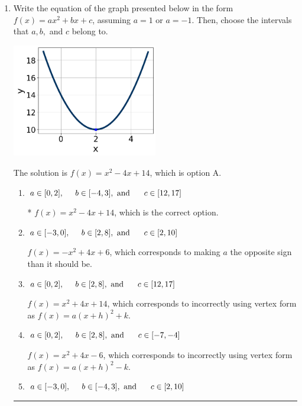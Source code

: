 \documentclass{extbook}[14pt]
\newcommand{\litem}[1]{\item #1

\rule{\textwidth}{0.4pt}}
\begin{document}
\begin{enumerate}\litem{
Write the equation of the graph presented below in the form $f(x)=ax^2+bx+c$, assuming  $a=1$ or $a=-1$. Then, choose the intervals that $a, b,$ and $c$ belong to.

\begin{center}
    \includegraphics[width=0.5\textwidth]{../Figures/quadraticGraphToEquationA.png}
\end{center}




The solution is \( f(x) = x^{2} -4 x + 14 \), which is option A.\begin{enumerate}[label=\Alph*.]
\item \( a \in [0, 2], \hspace*{5mm} b \in [-4, 3], \text{ and } \hspace*{5mm} c \in [12, 17] \)

* $f(x)=x^{2} -4 x + 14$, which is the correct option.
\item \( a \in [-3, 0], \hspace*{5mm} b \in [2, 8], \text{ and } \hspace*{5mm} c \in [2, 10] \)

$f(x)=-x^{2} +4 x + 6$, which corresponds to making $a$ the opposite sign than it should be.
\item \( a \in [0, 2], \hspace*{5mm} b \in [2, 8], \text{ and } \hspace*{5mm} c \in [12, 17] \)

$f(x)=x^{2} +4 x + 14$, which corresponds to incorrectly using vertex form as $f(x) = a(x+h)^2+k$.
\item \( a \in [0, 2], \hspace*{5mm} b \in [2, 8], \text{ and } \hspace*{5mm} c \in [-7, -4] \)

$f(x)=x^{2} +4 x -6$, which corresponds to incorrectly using vertex form as $f(x) = a(x+h)^2 - k$.
\item \( a \in [-3, 0], \hspace*{5mm} b \in [-4, 3], \text{ and } \hspace*{5mm} c \in [2, 10] \)


\end{enumerate}}
\end{enumerate}
\end{document}
